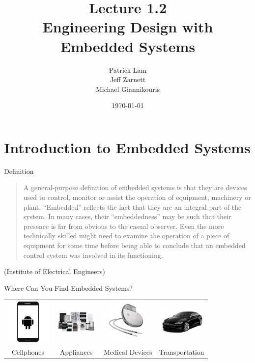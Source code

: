 \documentclass{beamer}
\title{Lecture 1.2 \\ Engineering Design with Embedded Systems}
\date{\today}
\author{Patrick Lam \\ Jeff Zarnett \\ Michael Giannikouris}
\institute{Department of Electrical and Computer Engineering}
\begin{document}
\maketitle

\section{Introduction to Embedded Systems}
	
	\begin{frame}{Definition}

		\begin{center}
			\begin{quote}
				A general-purpose definition of embedded systems is that they are
				devices used to control, monitor or assist the operation of equipment,
				machinery or plant. “Embedded” reflects the fact that they are an
				integral part of the system. In many cases, their “embeddedness” may
				be such that their presence is far from obvious to the casual observer.
				Even the more technically skilled might need to examine the operation
				of a piece of equipment for some time before being able to conclude
				that an embedded control system was involved in its functioning.
			\end{quote}
		\end{center}
		
		\begin{flushright}			
			(Institute of Electrical Engineers)
		\end{flushright}	
		
	\end{frame}  
	
	\begin{frame}{Where Can You Find Embedded Systems?}
		\begin{tabular}{c c c c}		
			\includegraphics[width=6em]{img/phone-icon-android-phone.png} &
			\includegraphics[width=6em]{img/appliances.png} &
			\includegraphics[width=6em]{img/Permanent-Pacemaker.png} &
			\includegraphics[width=6em]{img/must_diagonaal1.png} \\
			\tiny{Cellphones} &
			\tiny{Appliances} &
			\tiny{Medical Devices} &
			\tiny{Transportation}
		\end{tabular}
	\end{frame}
	
\end{document}
